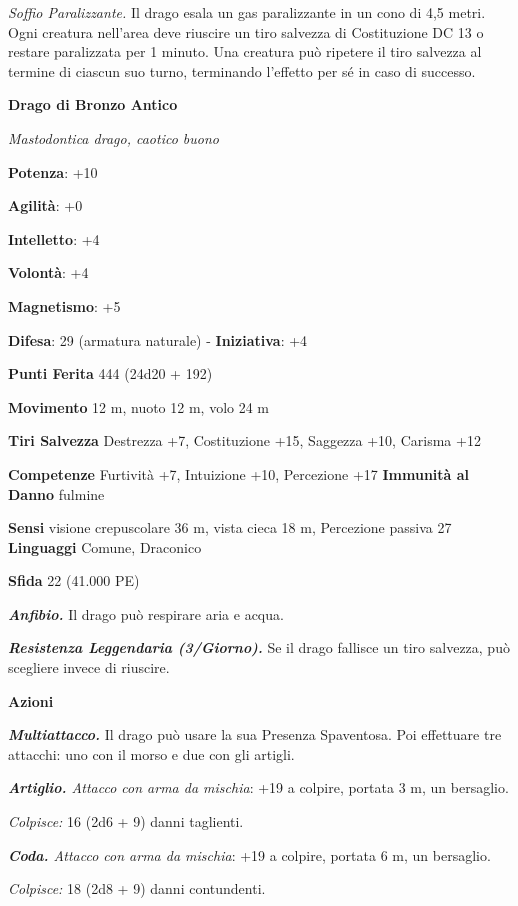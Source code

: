 \begin{multicols}{2}
\emph{Soffio Paralizzante.} Il drago esala un gas paralizzante in un
cono di 4,5 metri. Ogni creatura nell'area deve riuscire un tiro
salvezza di Costituzione DC 13 o restare paralizzata per 1 minuto. Una
creatura può ripetere il tiro salvezza al termine di ciascun suo turno,
terminando l'effetto per sé in caso di successo.



\textbf{Drago di Bronzo Antico}

\emph{Mastodontica drago, caotico buono}

\textbf{Potenza}: +10

\textbf{Agilità}: +0

\textbf{Intelletto}: +4

\textbf{Volontà}: +4

\textbf{Magnetismo}: +5

\textbf{Difesa}: 29 (armatura naturale) - \textbf{Iniziativa}: +4

\textbf{Punti Ferita} 444 (24d20 + 192)

\textbf{Movimento} 12 m, nuoto 12 m, volo 24 m

\textbf{Tiri Salvezza} Destrezza +7, Costituzione +15, Saggezza +10,
Carisma +12

\textbf{Competenze} Furtività +7, Intuizione +10, Percezione +17
\textbf{Immunità al Danno} fulmine

\textbf{Sensi} visione crepuscolare 36 m, vista cieca 18 m, Percezione passiva
27 \textbf{Linguaggi} Comune, Draconico

\textbf{Sfida} 22 (41.000 PE)\smallskip

\emph{\textbf{Anfibio.}} Il drago può respirare aria e acqua.

\emph{\textbf{Resistenza Leggendaria (3/Giorno).}} Se il drago fallisce
un tiro salvezza, può scegliere invece di riuscire.

\smallskip\textbf{Azioni}

\emph{\textbf{Multiattacco.}} Il drago può usare la sua Presenza
Spaventosa. Poi effettuare tre attacchi: uno con il morso e due con gli
artigli.

\emph{\textbf{Artiglio.} Attacco con arma da mischia}: +19 a colpire,
portata 3 m, un bersaglio.

\emph{Colpisce:} 16 (2d6 + 9) danni taglienti.

\emph{\textbf{Coda.} Attacco con arma da mischia}: +19 a colpire,
portata 6 m, un bersaglio.

\emph{Colpisce:} 18 (2d8 + 9) danni contundenti.


\end{multicols}
